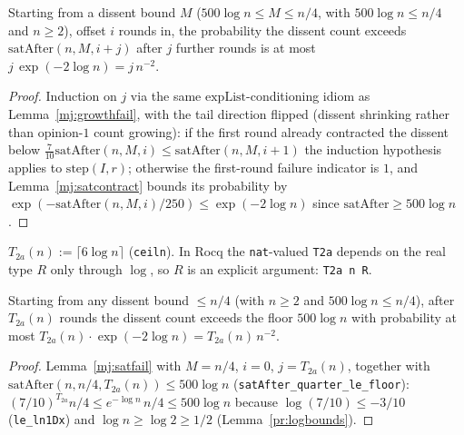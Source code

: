 \begin{lemma}\label{mj:satfail}
  \rocqok
  Starting from a dissent bound $M$ ($500\log n\le M\le n/4$, with
  $500 \log n \le n/4$ and $n \ge 2$), offset $i$
  rounds in, the probability the dissent count exceeds
  $\mathrm{satAfter}(n,M,i+j)$ after $j$ further rounds is at most
  $j\,\exp(-2\log n) = j\,n^{-2}$.
\end{lemma}
\begin{proof}
  \rocqok
  Induction on $j$ via the same $\mathrm{expList}$-conditioning idiom as
  Lemma~\ref{mj:growthfail}, with the tail direction flipped (dissent
  shrinking rather than opinion-$1$ count growing): if the first round
  already contracted the dissent below $\tfrac7{10}\mathrm{satAfter}(n,M,i)
  \le \mathrm{satAfter}(n,M,i+1)$ the induction hypothesis applies to
  $\mathrm{step}(I,r)$; otherwise the first-round failure indicator is $1$,
  and Lemma~\ref{mj:satcontract} bounds its probability by
  $\exp(-\mathrm{satAfter}(n,M,i)/250) \le \exp(-2\log n)$ since
  $\mathrm{satAfter} \ge 500 \log n$.
\end{proof}

\begin{definition}\label{mj:T2a}
  \rocqok
  $T_{2a}(n) := \lceil 6\log n \rceil$ (\texttt{ceiln}). In Rocq the
  \texttt{nat}-valued \texttt{T2a} depends on the real type $R$ only through
  $\log$, so $R$ is an explicit argument: \texttt{T2a n R}.
\end{definition}

\begin{lemma}\label{mj:stage2a}
  \rocqok
  Starting from any dissent bound $\le n/4$ (with $n \ge 2$ and
  $500 \log n \le n/4$), after $T_{2a}(n)$ rounds the dissent count exceeds
  the floor $500\log n$ with probability at most
  $T_{2a}(n)\cdot \exp(-2\log n) = T_{2a}(n)\, n^{-2}$.
\end{lemma}
\begin{proof}
  \rocqok
  Lemma~\ref{mj:satfail} with $M = n/4$, $i = 0$, $j = T_{2a}(n)$, together
  with $\mathrm{satAfter}(n, n/4, T_{2a}(n)) \le 500\log n$
  (\texttt{satAfter\_quarter\_le\_floor}): $(7/10)^{T_{2a}} n/4 \le
  e^{-\log n}\, n / 4 \le 500 \log n$ because $\log(7/10) \le -3/10$
  (\texttt{le\_ln1Dx}) and $\log n \ge \log 2 \ge 1/2$
  (Lemma~\ref{pr:logbounds}).
\end{proof}

